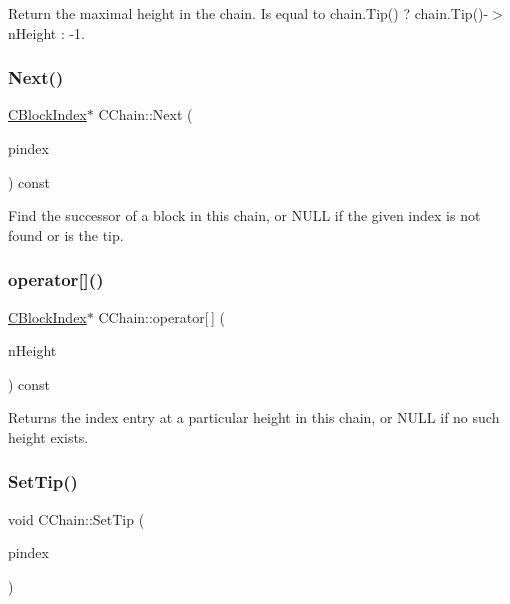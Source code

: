 Return the maximal height in the chain. Is equal to chain.\+Tip() ? chain.\+Tip()-\/$>$n\+Height \+: -\/1. \mbox{\label{class_c_chain_a3077e83c87e8a974765fa76a57fd040b}} 
\subsubsection{\texorpdfstring{Next()}{Next()}}
{\footnotesize\ttfamily \mbox{\hyperlink{class_c_block_index}{C\+Block\+Index}}$\ast$ C\+Chain\+::\+Next (\begin{DoxyParamCaption}\item[{const \mbox{\hyperlink{class_c_block_index}{C\+Block\+Index}} $\ast$}]{pindex }\end{DoxyParamCaption}) const\hspace{0.3cm}{\ttfamily [inline]}}

Find the successor of a block in this chain, or N\+U\+LL if the given index is not found or is the tip. \mbox{\label{class_c_chain_a13c4493c833ffb8d1725fde05e42b28a}} 
\subsubsection{\texorpdfstring{operator[]()}{operator[]()}}
{\footnotesize\ttfamily \mbox{\hyperlink{class_c_block_index}{C\+Block\+Index}}$\ast$ C\+Chain\+::operator\mbox{[}$\,$\mbox{]} (\begin{DoxyParamCaption}\item[{int}]{n\+Height }\end{DoxyParamCaption}) const\hspace{0.3cm}{\ttfamily [inline]}}

Returns the index entry at a particular height in this chain, or N\+U\+LL if no such height exists. \mbox{\label{class_c_chain_aeb563751f7362d4308c7c2cb35b834a5}} 
\subsubsection{\texorpdfstring{Set\+Tip()}{SetTip()}}
{\footnotesize\ttfamily void C\+Chain\+::\+Set\+Tip (\begin{DoxyParamCaption}\item[{\mbox{\hyperlink{class_c_block_index}{C\+Block\+Index}} $\ast$}]{pindex }\end{DoxyParamCaption})}

